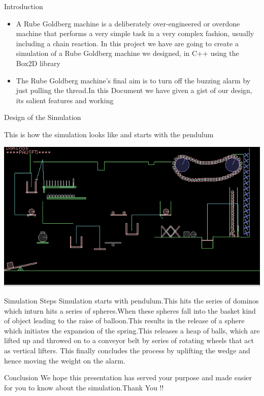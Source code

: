 \documentclass{beamer}
\begin{document}
\begin{frame}{Introduction}
\begin{itemize}
\item A Rube Goldberg machine is a deliberately over-engineered or overdone machine that performs a very simple task in a very complex fashion, usually including a chain reaction. In this project we have are going to create a simulation of a Rube Goldberg machine we designed, in C++ using the Box2D library

\item The Rube Goldberg machine's final aim is to turn off the buzzing alarm by just pulling the thread.In this Document we have given a gist of our design, its salient features and working
\end{itemize}
\end{frame}

\begin{frame}{Design of the Simulation}
	
	 This is how the simulation looks like and starts with the pendulum
    \begin{center}
     \includegraphics[width=1.0\textwidth]{2.png}
     \end{center}
\end{frame}

\begin{frame}{Simulation Steps}
Simulation starts with pendulum.This hits the series of dominos which inturn hits a series of  spheres.When these spheres fall into the basket kind of object leading to the raise of balloon.This results in the release of a sphere which initiates the expansion of the spring.This releases a heap of balls, which are lifted up and throwed on to a conveyor belt by series of rotating wheels that act as vertical lifters. This finally concludes the process by uplifting the wedge and hence moving the weight on the alarm.
\end{frame}

\begin{frame}{Conclusion}
We hope this presentation has served your purpose and made easier for you to know about the simulation.Thank You !!
\end{frame}
\end{document}
